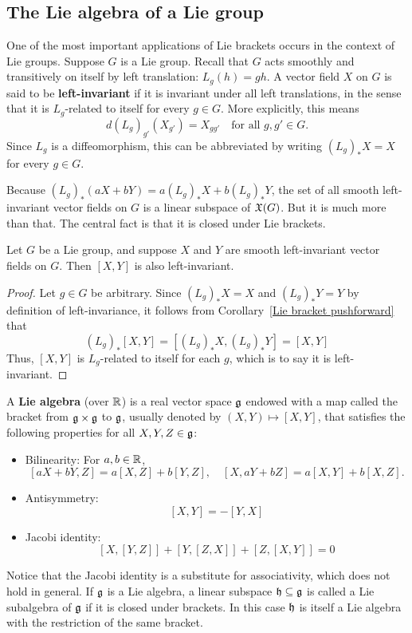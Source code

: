 \subsection{The Lie algebra of a Lie group}
One of the most important applications of Lie brackets occurs in the context of Lie groups. Suppose $G$ is a Lie group. Recall that $G$ acts smoothly and transitively on itself by left translation: $L_g(h)=gh$. A vector field $X$ on $G$ is said to be \textbf{left-invariant} if it is invariant under all left translations, in the sense that it is $L_g$-related to itself for every $g\in G$. More explicitly, this means
\[d(L_g)_{g'}(X_{g'})=X_{gg'}\quad\text{for all }g,g'\in G.\]
Since $L_g$ is a diffeomorphism, this can be abbreviated by writing $(L_g)_*X=X$ for every $g\in G$.\par
Because $(L_g)_*(aX+bY)=a(L_g)_*X+b(L_g)_*Y$, the set of all smooth left-invariant vector fields on $G$ is a linear subspace of $\mathfrak{X}(G)$. But it is much more than that. The central fact is that it is closed under Lie brackets.
\begin{proposition}
Let $G$ be a Lie group, and suppose $X$ and $Y$ are smooth left-invariant vector fields on $G$. Then $[X,Y]$ is also left-invariant.
\end{proposition}
\begin{proof}
Let $g\in G$ be arbitrary. Since $(L_g)_*X=X$ and $(L_g)_*Y=Y$ by definition of left-invariance, it follows from Corollary~\ref{Lie bracket pushforward} that
\[(L_g)_*[X,Y]=[(L_g)_*X,(L_g)_*Y]=[X,Y]\]
Thus, $[X,Y]$ is $L_g$-related to itself for each $g$, which is to say it is left-invariant.
\end{proof}
A \textbf{Lie algebra} (over $\mathbb{R}$) is a real vector space $\mathfrak{g}$ endowed with a map called the bracket from $\mathfrak{g}\times\mathfrak{g}$ to $\mathfrak{g}$, usually denoted by $(X,Y)\mapsto[X,Y]$, that satisfies the following properties for all $X,Y,Z\in\mathfrak{g}$:
\begin{itemize}
\item Bilinearity: For $a,b\in\mathbb{R}$,
\[[aX+bY,Z]=a[X,Z]+b[Y,Z],\quad [X,aY+bZ]=a[X,Y]+b[X,Z].\]
\item Antisymmetry:
\[[X,Y]=-[Y,X]\]
\item Jacobi identity:
\[[X,[Y,Z]]+[Y,[Z,X]]+[Z,[X,Y]]=0\]
\end{itemize}
Notice that the Jacobi identity is a substitute for associativity, which does not hold in general. If $\mathfrak{g}$ is a Lie algebra, a linear subspace $\mathfrak{h}\subseteq\mathfrak{g}$ is called a Lie subalgebra of $\mathfrak{g}$ if it is closed under brackets. In this case $\mathfrak{h}$ is itself a Lie algebra with the restriction of the same bracket.\par
